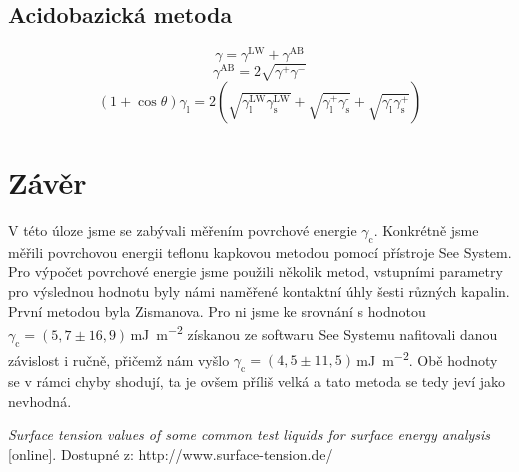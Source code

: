 \documentclass{protokol}
\begin{document}
\subsection{Acidobazická metoda}
\begin{equation}
	\gamma = \gamma^{\text{LW}} + \gamma^{\text{AB}}
\end{equation}
\begin{equation}
	\gamma^{\text{AB}} = 2\sqrt{\gamma^+\gamma^-}
\end{equation}
\begin{equation}
		\left(1+\cos\theta\right)\gamma_{\text{l}} = 
		2\left(\sqrt{\gamma_\text{l}^{\text{LW}}\gamma_\text{s}^{\text{LW}}} + 
		\sqrt{\gamma_\text{l}^{\text{+}}\gamma_\text{s}^{\text{-}}} + 
		\sqrt{\gamma_\text{l}^{\text{-}}\gamma_\text{s}^{\text{+}}}\right)
\end{equation}
\par 







\section{Závěr}
V této úloze jsme se zabývali měřením povrchové energie  $\gamma_{\text{c}}$. Konkrétně jsme měřili povrchovou energii teflonu kapkovou metodou pomocí přístroje See System. Pro výpočet povrchové energie jsme použili několik metod, vstupními parametry pro výslednou hodnotu byly námi naměřené kontaktní úhly šesti různých kapalin. První metodou byla Zismanova. Pro ni jsme ke srovnání s hodnotou $\gamma_{\text{c}} = (5,7\pm16,9)$\,\si{\milli\joule\per\meter\squared} získanou ze softwaru See Systemu nafitovali danou závislost i ručně, přičemž nám vyšlo $\gamma_{\text{c}} = 
(4,5\pm11,5)$\,\si{\milli\joule\per\meter\squared}. Obě hodnoty se v rámci chyby shodují, ta je ovšem příliš velká a tato metoda se tedy jeví jako nevhodná.


\begin{thebibliography}{10}
	 {\textit{Surface tension values of some common test 
	liquids 
	for surface energy analysis} [online]. Dostupné z: 
	http://www.surface-tension.de/}
	
\end{thebibliography}
\end{document}
